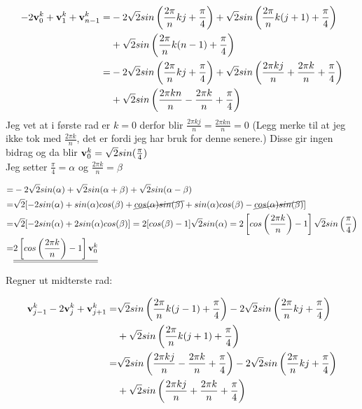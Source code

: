 \documentclass[a4paper,12pt,norsk]{article}
\begin{document}
\begin{align*}
-2\bold{v}^{k}_{0}+\bold{v}^{k}_{1}+\bold{v}^{k}_{n-1} =& -2\sqrt{2}sin\left(\frac{2\pi}{n}kj+\frac{\pi}{4}\right) +\sqrt{2}sin\left(\frac{2\pi}{n}k(j+1)+\frac{\pi}{4}\right) \\ 
&+ \sqrt{2}sin\left(\frac{2\pi}{n}k(n-1)+\frac{\pi}{4}\right) \\
=& -2\sqrt{2}sin\left(\frac{2\pi}{n}kj+\frac{\pi}{4}\right) + \sqrt{2}sin\left(\frac{2\pi kj}{n}+\frac{2\pi k}{n}+\frac{\pi}{4}\right) \\
&+ \sqrt{2}sin\left(\frac{2\pi kn}{n}-\frac{2\pi k}{n} +\frac{\pi}{4}\right)
\end{align*}
Jeg vet at i første rad er $k=0$ derfor blir $\frac{2\pi kj}{n} = \frac{2\pi kn}{n} = 0$ (Legg merke til at jeg ikke tok med $\frac{2\pi k}{n}$, det er fordi jeg har bruk for denne senere.)
Disse gir ingen bidrag og da blir $\bold{v}^k_0 =  \sqrt{2}sin(\frac{\pi}{4})$\\
Jeg setter $\frac{\pi}{4} = \alpha$ og $\frac{2\pi k}{n} = \beta$

\begin{align*}
=& -2\sqrt{2}sin(\alpha) + \sqrt{2}sin(\alpha + \beta) + \sqrt{2}sin(\alpha - \beta)\\
=& \sqrt{2}[-2sin(\alpha) + sin(\alpha)cos(\beta) + \cancel{cos(\alpha)sin(\beta)} +sin(\alpha)cos(\beta) - \cancel{cos(\alpha)sin(\beta)}]\\
=& \sqrt{2}[-2sin(\alpha) + 2sin(\alpha)cos(\beta)] = 2[cos(\beta) - 1]\sqrt{2}sin(\alpha) = 2\left[cos\left(\frac{2\pi k}{n}\right) - 1\right]\sqrt{2}sin\left(\frac{\pi}{4} \right)\\ 
=& \underline{\underline{2\left[cos\left(\frac{2\pi k}{n}\right) - 1\right]\bold{v}^k_0 }}
\end{align*}

Regner ut midterste rad:

\begin{align*}
\bold{v}^k_{j-1} - 2\bold{v}^k_j + \bold{v}^k_{j+1} =& \sqrt{2}sin\left(\frac{2\pi}{n}k(j-1) + \frac{\pi}{4}\right) -2\sqrt{2}sin\left(\frac{2\pi}{n}kj+\frac{\pi}{4}\right) \\
&+\sqrt{2}sin\left(\frac{2\pi}{n}k(j+1)+\frac{\pi}{4}\right)\\
=& \sqrt{2}sin\left(\frac{2\pi kj}{n}-\frac{2\pi k}{n}+\frac{\pi}{4}\right) -2\sqrt{2}sin\left(\frac{2\pi}{n}kj+\frac{\pi}{4}\right) \\
&+ \sqrt{2}sin\left(\frac{2\pi kj}{n}+\frac{2\pi k}{n} +\frac{\pi}{4}\right)
\end{align*}
\end{document}
